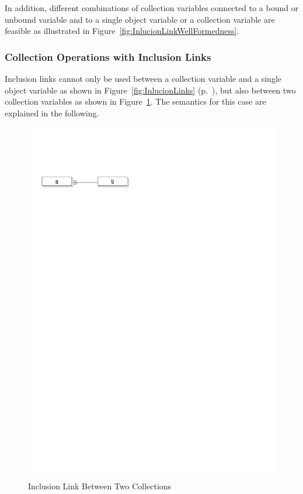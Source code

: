 In addition, different combinations of collection variables connected to a bound or unbound variable and
to a single object variable or a collection variable are feasible as illustrated in Figure~\ref{fig:InlucionLinkWellFormedness}.


\subsubsection{Collection Operations with Inclusion Links}
\label{sec:StoryPatterns:inclusion:BagsSetsEtc}

Inclusion links cannot only be used between a collection variable and a single object variable
as shown in Figure~\ref{fig:InlucionLinks} (p.~\pageref{fig:InlucionLinks}),
but also between two collection variables as shown in Figure~\ref{fig:InlucionLinkCollections}.
The semantics for this case are explained in the following.

\begin{figure}[htb]
  \centering
  \includegraphics[scale=0.8]{figures/InclusionLinksSetsCheck}
  \caption{Inclusion Link Between Two Collections}
  \label{fig:InlucionLinkCollections}
\end{figure}


